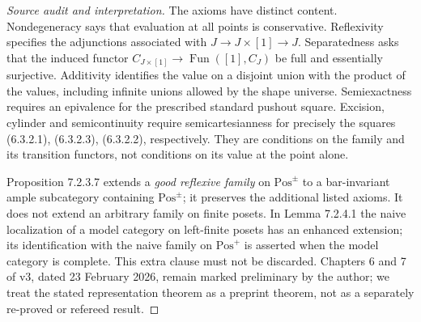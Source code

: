 \begin{proof}[Source audit and interpretation]
The axioms have distinct content. Nondegeneracy says that evaluation
at all points is conservative. Reflexivity specifies the adjunctions
associated with $J\to J\times[1]\to J$. Separatedness asks that
the induced functor $C_{J\times[1]}\to\operatorname{Fun}([1],C_J)$
be full and essentially surjective. Additivity identifies the value
on a disjoint union with the product of the values, including infinite
unions allowed by the shape universe. Semiexactness requires an
epivalence for the prescribed standard pushout square. Excision,
cylinder and semicontinuity require semicartesianness for precisely
the squares (6.3.2.1), (6.3.2.3), (6.3.2.2), respectively. They are
conditions on the family and its transition functors, not conditions
on its value at the point alone.

Proposition 7.2.3.7 extends a \emph{good reflexive family} on
$\mathrm{Pos}^{\pm}$ to a bar-invariant ample subcategory containing
$\mathrm{Pos}^{\pm}$; it preserves the additional listed axioms.
It does not extend an arbitrary family on finite posets. In Lemma
7.2.4.1 the naive localization of a model category on left-finite
posets has an enhanced extension; its identification with the naive
family on $\mathrm{Pos}^{+}$ is asserted when the model category is
complete. This extra clause must not be discarded. Chapters 6 and 7
of v3, dated 23 February 2026, remain marked preliminary by the author;
we treat the stated representation theorem as a preprint theorem,
not as a separately re-proved or refereed result.
\end{proof}

